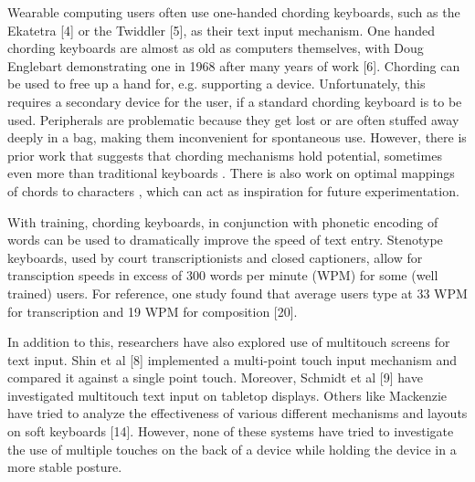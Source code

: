 Wearable computing users often use one-handed chording keyboards, such as the Ekatetra [4] or the Twiddler [5], as their text input mechanism. One handed chording keyboards are almost as old as computers themselves, with Doug Englebart demonstrating one in 1968 after many years of work [6]. Chording can be used to free up a hand for, e.g. supporting a device.  Unfortunately, this requires a secondary device for the user, if a standard chording keyboard is to be used.  Peripherals are problematic because they get lost or are often stuffed away deeply in a bag, making them inconvenient for spontaneous use. However, there is prior work that suggests that chording mechanisms hold potential, sometimes even more than traditional keyboards . There is also work on optimal mappings of chords to characters , which can act as inspiration for future experimentation. 

With training, chording keyboards, in conjunction with phonetic encoding of words can be used to dramatically improve the speed of text entry.  Stenotype keyboards, used by court transcriptionists and closed captioners, allow for transciption speeds in excess of 300 words per minute (WPM) for some (well trained) users.  For reference, one study found that average users type at 33 WPM for transcription and 19 WPM for composition [20].

In addition to this, researchers have also explored use of multitouch screens for text input. Shin et al [8] implemented a multi-point touch input mechanism and compared it against a single point touch. Moreover, Schmidt et al [9] have investigated multitouch text input on tabletop displays. Others like Mackenzie have tried to analyze the effectiveness of various different mechanisms and layouts on soft keyboards [14]. However, none of these systems have tried to investigate the use of multiple touches on the back of a device while holding the device in a more stable posture.
